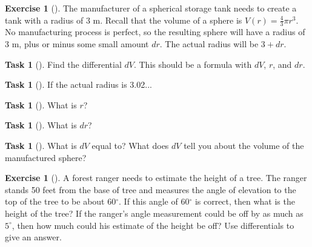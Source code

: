 \documentclass[10pt,]{book}
\theoremstyle{plain}
\theoremstyle{definition}
\theoremstyle{definition}
\theoremstyle{definition}
\theoremstyle{definition}
\newtheorem{exploration}[project]{Exercise}
\newtheorem{task}[project]{Task}
\theoremstyle{definition}
\numberwithin{equation}{section}
\begin{document}
\begin{exploration}[]\label{diff-sphere}
The manufacturer of a spherical storage tank needs to create a tank with a radius of 3 m. Recall that the volume of a sphere is \(V(r) = \frac{4}{3}\pi r^3\). No manufacturing process is perfect, so the resulting sphere will have a radius of 3 m, plus or minus some small amount \(dr\). The actual radius will be \(3+dr\).%
\begin{task}[]\label{task-8}
Find the differential \(dV\). This should be a formula with \(dV\), \(r\), and \(dr\).%
\end{task}
\begin{task}[]\label{task-9}
If the actual radius is 3.02...%
\begin{task}[]\label{task-10}
What is \(r\)?%
\end{task}
\begin{task}[]\label{task-11}
What is \(dr\)?%
\end{task}
\end{task}
\begin{task}[]\label{task-12}
What is \(dV\) equal to? What does \(dV\) tell you about the volume of the manufactured sphere?%
\end{task}
\end{exploration}
\begin{exploration}[]\label{exploration-12}
A forest ranger needs to estimate the height of a tree. The ranger stands 50 feet from the base of tree and measures the angle of elevation to the top of the tree to be about 60\(^\circ\). If this angle of 60\(^\circ\) is correct, then what is the height of the tree? If the ranger's angle measurement could be off by as much as \(5^\circ\), then how much could his estimate of the height be off? Use differentials to give an answer.%
\end{exploration}
\typeout{************************************************}
\typeout{************************************************}
\end{document}
